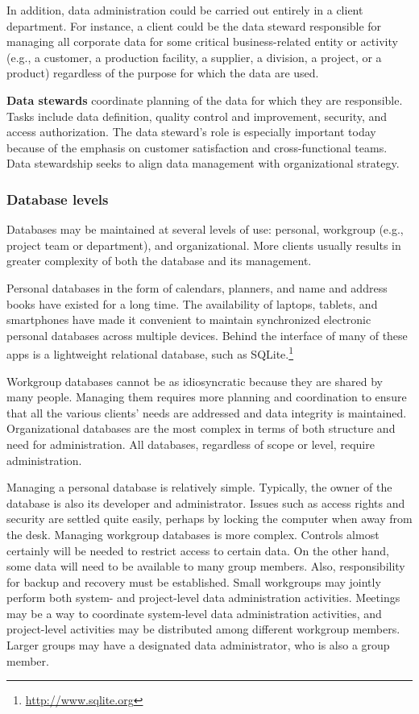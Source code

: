 \documentclass[
]{article}
\begin{document}
In addition, data administration could be carried out entirely in a
client department. For instance, a client could be the data steward
responsible for managing all corporate data for some critical
business-related entity or activity (e.g., a customer, a production
facility, a supplier, a division, a project, or a product) regardless of
the purpose for which the data are used.

\textbf{Data stewards} coordinate planning of the data for which they are
responsible. Tasks include data definition, quality control and
improvement, security, and access authorization. The data steward's role
is especially important today because of the emphasis on customer
satisfaction and cross-functional teams. Data stewardship seeks to align
data management with organizational strategy.

\hypertarget{database-levels}{%
\subsubsection*{Database levels}\label{database-levels}}

Databases may be maintained at several levels of use: personal,
workgroup (e.g., project team or department), and organizational. More
clients usually results in greater complexity of both the database and
its management.

Personal databases in the form of calendars, planners, and name and
address books have existed for a long time. The availability of laptops,
tablets, and smartphones have made it convenient to maintain
synchronized electronic personal databases across multiple devices.
Behind the interface of many of these apps is a lightweight relational
database, such as SQLite.\footnote{\url{http://www.sqlite.org}}

Workgroup databases cannot be as idiosyncratic because they are shared
by many people. Managing them requires more planning and coordination to
ensure that all the various clients' needs are addressed and data
integrity is maintained. Organizational databases are the most complex
in terms of both structure and need for administration. All databases,
regardless of scope or level, require administration.

Managing a personal database is relatively simple. Typically, the owner
of the database is also its developer and administrator. Issues such as
access rights and security are settled quite easily, perhaps by locking
the computer when away from the desk. Managing workgroup databases is
more complex. Controls almost certainly will be needed to restrict
access to certain data. On the other hand, some data will need to be
available to many group members. Also, responsibility for backup and
recovery must be established. Small workgroups may jointly perform both
system- and project-level data administration activities. Meetings may
be a way to coordinate system-level data administration activities, and
project-level activities may be distributed among different workgroup
members. Larger groups may have a designated data administrator, who is
also a group member.
\end{document}

